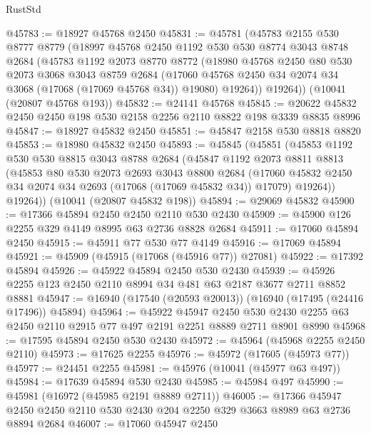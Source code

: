 \begin{lexlean}{RustStd}
\begin{coremodule}
@45783 := @18927 @45768 @2450
@45831 := @45781
    (@45783
      @2155
      @530
      @8777
      @8779
      (@18997
        @45768
        @2450
        @1192
        @530
        @530
        @8774
        @3043
        @8748
        @2684
        (@45783
          @1192
          @2073
          @8770
          @8772
          (@18980
            @45768
            @2450
            @80
            @530
            @2073
            @3068
            @3043
            @8759
            @2684
            (@17060 @45768 @2450 @34 @2074 @34 @3068 (@17068 (@17069 @45768 @34)) @19080)
            @19264))
        @19264))
    (@10041 (@20807 @45768 @193))
@45832 := @24141 @45768
@45845 := @20622 @45832 @2450 @2450 @198 @530 @2158 @2256 @2110 @8822 @198 @3339 @8835 @8996
@45847 := @18927 @45832 @2450
@45851 := @45847 @2158 @530 @8818 @8820
@45853 := @18980 @45832 @2450
@45893 := @45845
    (@45851
      (@45853
        @1192
        @530
        @530
        @8815
        @3043
        @8788
        @2684
        (@45847
          @1192
          @2073
          @8811
          @8813
          (@45853
            @80
            @530
            @2073
            @2693
            @3043
            @8800
            @2684
            (@17060 @45832 @2450 @34 @2074 @34 @2693 (@17068 (@17069 @45832 @34)) @17079)
            @19264))
        @19264))
    (@10041 (@20807 @45832 @198))
@45894 := @29069 @45832
@45900 := @17366 @45894 @2450 @2450 @2110 @530 @2430
@45909 := @45900 @126 @2255 @329 @4149 @8995 @63 @2736 @8828 @2684
@45911 := @17060 @45894 @2450
@45915 := @45911 @77 @530 @77 @4149
@45916 := @17069 @45894
@45921 := @45909 (@45915 (@17068 (@45916 @77)) @27081)
@45922 := @17392 @45894
@45926 := @45922 @45894 @2450 @530 @2430
@45939 := @45926 @2255 @123 @2450 @2110 @8994 @34 @481 @63 @2187 @3677 @2711 @8852 @8881
@45947 := @16940 (@17540 (@20593 @20013)) (@16940 (@17495 (@24416 @17496)) @45894)
@45964 := @45922
    @45947
    @2450
    @530
    @2430
    @2255
    @63
    @2450
    @2110
    @2915
    @77
    @497
    @2191
    @2251
    @8889
    @2711
    @8901
    @8990
@45968 := @17595 @45894 @2450 @530 @2430
@45972 := @45964 (@45968 @2255 @2450 @2110)
@45973 := @17625 @2255
@45976 := @45972 (@17605 (@45973 @77))
@45977 := @24451 @2255
@45981 := @45976 (@10041 (@45977 @63 @497))
@45984 := @17639 @45894 @530 @2430
@45985 := @45984 @497
@45990 := @45981 (@16972 (@45985 @2191 @8889 @2711))
@46005 := @17366
    @45947
    @2450
    @2450
    @2110
    @530
    @2430
    @204
    @2250
    @329
    @3663
    @8989
    @63
    @2736
    @8894
    @2684
@46007 := @17060 @45947 @2450

\end{coremodule}
\end{lexlean}
